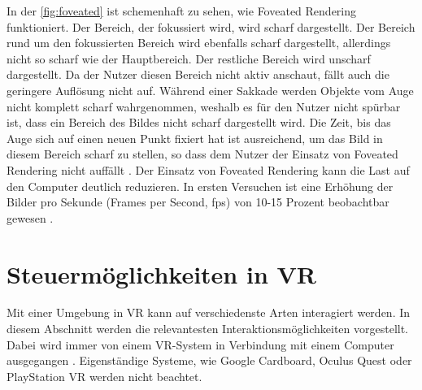 In der \autoref{fig:foveated} ist schemenhaft zu sehen, wie Foveated Rendering funktioniert. Der Bereich, der fokussiert wird, wird scharf dargestellt. Der Bereich rund um den fokussierten Bereich wird ebenfalls scharf dargestellt, allerdings nicht so scharf wie der Hauptbereich.  Der restliche Bereich wird unscharf dargestellt. Da der Nutzer diesen Bereich nicht aktiv anschaut, fällt auch die geringere Auflösung nicht auf. Während einer Sakkade werden Objekte vom Auge nicht komplett scharf wahrgenommen, weshalb es für den Nutzer nicht spürbar ist, dass ein Bereich des Bildes nicht scharf dargestellt wird. Die Zeit, bis das Auge sich auf einen neuen Punkt fixiert hat ist ausreichend, um das Bild in diesem Bereich scharf zu stellen, so dass dem Nutzer der Einsatz von Foveated Rendering nicht auffällt \cite{Albert.2017}. Der Einsatz von Foveated Rendering kann die Last auf den Computer deutlich reduzieren. In ersten Versuchen ist eine Erhöhung der Bilder pro Sekunde (Frames per Second, fps) von 10-15 Prozent beobachtbar gewesen \cite{H.Kim.2018}. 

\section{Steuermöglichkeiten in VR}
Mit einer Umgebung in VR kann auf verschiedenste Arten interagiert werden. In diesem Abschnitt werden die relevantesten Interaktionsmöglichkeiten vorgestellt. Dabei wird immer von einem VR-System in Verbindung mit einem Computer ausgegangen . Eigenständige Systeme, wie Google Cardboard, Oculus Quest oder PlayStation VR werden nicht beachtet.

